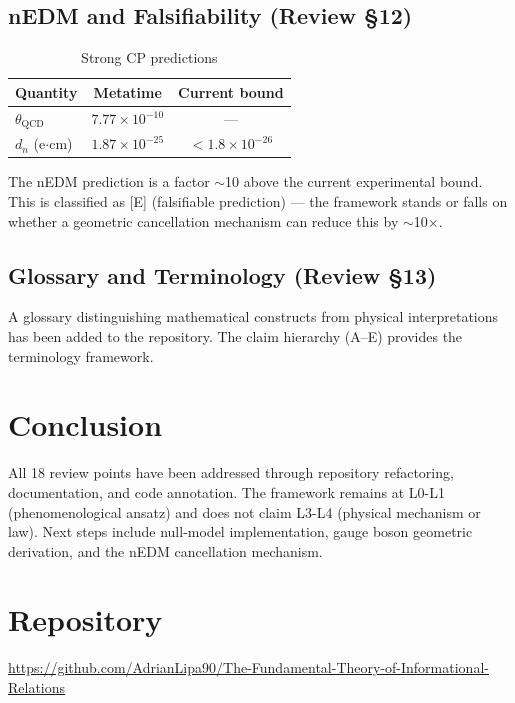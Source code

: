 \documentclass[12pt,a4paper]{article}
\begin{document}
\subsection{nEDM and Falsifiability (Review \S12)}
\begin{table}[h]
\centering
\caption{Strong CP predictions}
\begin{tabular}{lcc}
\toprule
Quantity & Metatime & Current bound \\
\midrule
$\theta_{\text{QCD}}$ & $7.77 \times 10^{-10}$ & --- \\
$d_n$ (e$\cdot$cm) & $1.87 \times 10^{-25}$ & $< 1.8 \times 10^{-26}$ \\
\bottomrule
\end{tabular}
\end{table}
The nEDM prediction is a factor $\sim$10 above the current experimental bound.
This is classified as [E] (falsifiable prediction) --- the framework stands or falls
on whether a geometric cancellation mechanism can reduce this by $\sim$10$\times$.

\subsection{Glossary and Terminology (Review \S13)}
A glossary distinguishing mathematical constructs from physical interpretations
has been added to the repository. The claim hierarchy (A--E) provides the
terminology framework.

\section{Conclusion}

All 18 review points have been addressed through repository refactoring,
documentation, and code annotation. The framework remains at L0-L1
(phenomenological ansatz) and does not claim L3-L4 (physical mechanism or law).
Next steps include null-model implementation, gauge boson geometric derivation,
and the nEDM cancellation mechanism.

\section*{Repository}
\url{https://github.com/AdrianLipa90/The-Fundamental-Theory-of-Informational-Relations}
\end{document}
